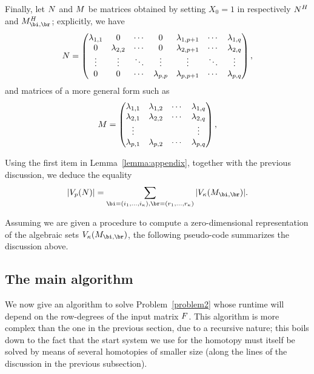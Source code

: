 \documentclass[12pt]{article}
\begin{document}
Finally, let ${N}$ and ${M}$ be matrices obtained by setting $X_0=1$
in respectively ${N}^H$ and $\mM_ {\bi,\br}^H$;
explicitly, we have
\begin{align}\label{eqdef:type1aff}
{N}= \left( \begin{matrix}
\lambda_{1,1} & 0 & \cdots & 0 & \lambda_{1,p+1} & \cdots & \lambda_{1, q}\\
0 & \lambda_{2,2} & \cdots & 0 & \lambda_{2,p+1} & \cdots & \lambda_{2, q}\\
\vdots & \vdots & \ddots & \vdots & \vdots & \ddots & \vdots\\
0 & 0 & \cdots & \lambda_{p,p} & \lambda_{p,p+1} & \cdots & \lambda_{p, q}
\end{matrix} \right),
\end{align}
and matrices of a more general form such as
\begin{align}\label{eqdef:type2aff}
{M}= \left( \begin{matrix}
\lambda_{1,1} & \lambda_{1,2} & \cdots & \lambda_{1, q}\\
 \lambda_{2,1} &  \lambda_{2,2} & \cdots & \lambda_{2, q}\\
 \vdots & & & \vdots\\
 \lambda_{p,1} &  \lambda_{p,2}& \cdots & \lambda_{p, q}
\end{matrix} \right),
\end{align}

 Using the first item in
Lemma~\ref{lemma:appendix}, together with the previous discussion, we
deduce the equality
\begin{align}\label{eq:cardinality}
|V_p(\mN)| = \sum_{\bi=(i_1,\dots,i_\kappa),\br=(r_1,\dots,r_\kappa)}  |V_\kappa(\mM_{\bi,\br})|.
\end{align}

Assuming we are given a procedure to compute a zero-dimensional
representation of the algebraic sets $V_\kappa(\mM_{\bi,\br})$, the
following pseudo-code summarizes the discussion above.


\subsection{The main algorithm}

We now give an algorithm to solve Problem~\ref{problem2} whose runtime
will depend on the row-degrees of the input matrix ${F}$. This
algorithm is more complex than the one in the previous section, due to
a recursive nature; this boils down to the fact that the start system
we use for the homotopy must itself be solved by means of several
homotopies of smaller size (along the lines of the discussion in the 
previous subsection).
\end{document}
